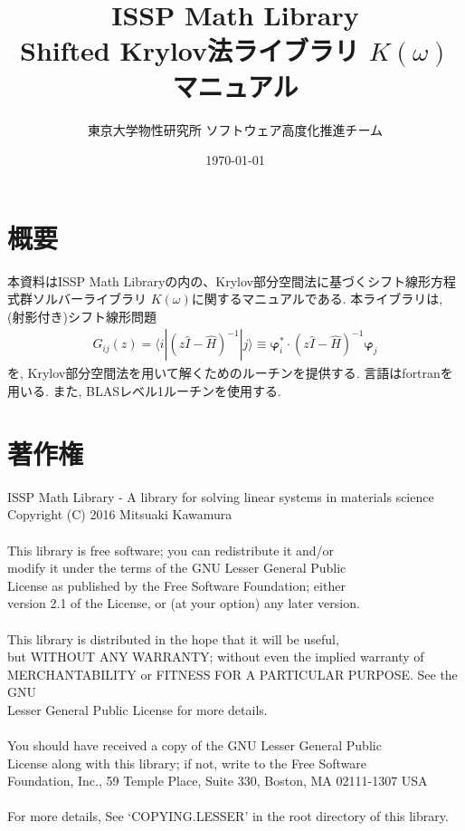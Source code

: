 \documentclass[12pt,titlepage]{jarticle}
\begin{document}
%
%
\title{ISSP Math Library \\
  Shifted Krylov法ライブラリ $K(\omega)$ マニュアル}
\author{東京大学物性研究所 ソフトウェア高度化推進チーム}
\date{\today}
\maketitle
%

%
%
\tableofcontents

\section{概要}

本資料はISSP Math Libraryの内の、Krylov部分空間法に基づくシフト線形方程式群ソルバーライブラリ
$K(\omega)$に関するマニュアルである.
本ライブラリは, (射影付き)シフト線形問題
\begin{align}
  G_{i j}(z) = \langle i | (z {\hat I} -{\hat H})^{-1}| j \rangle \equiv 
  {\boldsymbol \varphi}_i^{*} \cdot (z{\hat I}-{\hat H})^{-1} {\boldsymbol \varphi}_j
\end{align}
を, Krylov部分空間法を用いて解くためのルーチンを提供する.
言語はfortranを用いる. 
また, BLASレベル1ルーチンを使用する.

\section{著作権}

\noindent
ISSP Math Library - A library for solving linear systems in materials science \\
Copyright (C) 2016 Mitsuaki Kawamura \\
 \\
This library is free software; you can redistribute it and/or \\
modify it under the terms of the GNU Lesser General Public \\
License as published by the Free Software Foundation; either \\
version 2.1 of the License, or (at your option) any later version. \\
 \\
This library is distributed in the hope that it will be useful, \\
but WITHOUT ANY WARRANTY; without even the implied warranty of \\
MERCHANTABILITY or FITNESS FOR A PARTICULAR PURPOSE.  See the GNU \\
Lesser General Public License for more details. \\
 \\
You should have received a copy of the GNU Lesser General Public \\
License along with this library; if not, write to the Free Software \\
Foundation, Inc., 59 Temple Place, Suite 330, Boston, MA  02111-1307  USA \\
 \\
For more details, See `COPYING.LESSER' in the root directory of this library.
\end{document}
